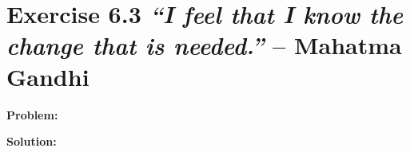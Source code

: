 \section{Exercise 6.3 \emph{``I feel that I know the change that is needed.''} -- Mahatma Gandhi}
\textbf{Problem:} 

\textbf{Solution:} 